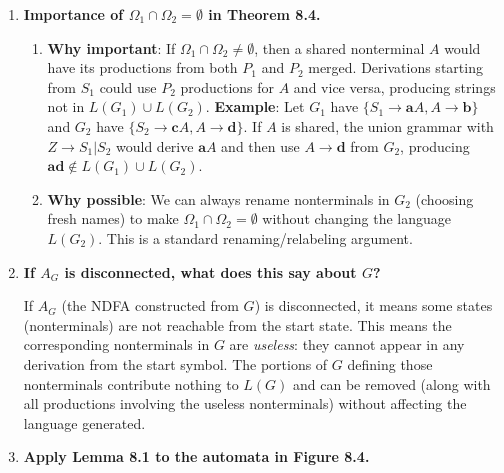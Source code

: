 \begin{enumerate}[{8.}1. ]
\begin{enumerate}
\item The definition of regular grammars should \emph{not} be expanded to include such mixed grammars, because the resulting class of languages would no longer coincide with the regular languages. Mixed grammars generate languages (like palindromes) that are context-free but not regular.
\end{enumerate}

\item \textbf{Importance of $\Omega_1 \cap \Omega_2 = \emptyset$ in Theorem 8.4.}

\begin{enumerate}
\item \textbf{Why important}: If $\Omega_1 \cap \Omega_2 \neq \emptyset$, then a shared nonterminal $A$ would have its productions from both $P_1$ and $P_2$ merged. Derivations starting from $S_1$ could use $P_2$ productions for $A$ and vice versa, producing strings not in $L(G_1) \cup L(G_2)$.
\textbf{Example}: Let $G_1$ have $\{S_1 \to \pmb{a}A, A \to \pmb{b}\}$ and $G_2$ have $\{S_2 \to \pmb{c}A, A \to \pmb{d}\}$. If $A$ is shared, the union grammar with $Z \to S_1 | S_2$ would derive $\pmb{a}A$ and then use $A \to \pmb{d}$ from $G_2$, producing $\pmb{ad} \notin L(G_1) \cup L(G_2)$.

\item \textbf{Why possible}: We can always rename nonterminals in $G_2$ (choosing fresh names) to make $\Omega_1 \cap \Omega_2 = \emptyset$ without changing the language $L(G_2)$. This is a standard renaming/relabeling argument.
\end{enumerate}

\item \textbf{If $A_G$ is disconnected, what does this say about $G$?}

If $A_G$ (the NDFA constructed from $G$) is disconnected, it means some states (nonterminals) are not reachable from the start state. This means the corresponding nonterminals in $G$ are \emph{useless}: they cannot appear in any derivation from the start symbol. The portions of $G$ defining those nonterminals contribute nothing to $L(G)$ and can be removed (along with all productions involving the useless nonterminals) without affecting the language generated.

\item \textbf{Apply Lemma 8.1 to the automata in Figure 8.4.}


\end{enumerate}
